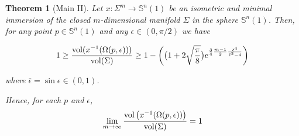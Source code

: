 \documentclass{amsart}
\newtheorem{theorem}{Theorem}[section]
\theoremstyle{definition}
\theoremstyle{remark}
\begin{document}
\begin{theorem}[Main II]\label{extconc2}
Let  $x: \Sigma^m \to \mathbb{S}^n(1)$ be an isometric and minimal immersion of the closed $m$-dimensional manifold $\Sigma$ in the sphere  $\mathbb{S}^n(1)$. Then, for any point $p \in \mathbb{S}^n(1)$ and any  $\epsilon \in (0,\pi/2)$ we have 

$$
1\geq \frac{{\rm vol}(x^{-1}(\Omega(p,\epsilon)))}{{\rm vol}(\Sigma)}\\\geq 1- \bigg(\big( 1+2 \sqrt{\frac{\pi}{8}} \big)e^{\frac{3}{4}\frac{m-1}{2}\frac{\bar\epsilon^4}{\bar\epsilon^2-4}}\bigg)
$$

\noindent where $\bar\epsilon=\sin\epsilon \in (0,1)$.
\medskip

Hence, for each $p$ and $\epsilon$,
$$
\lim_{m\to\infty}\frac{{\rm vol}\left(x^{-1}(\Omega(p,\epsilon))\right)}{{\rm vol}(\Sigma)}=1
$$

\end{theorem}
\end{document}
